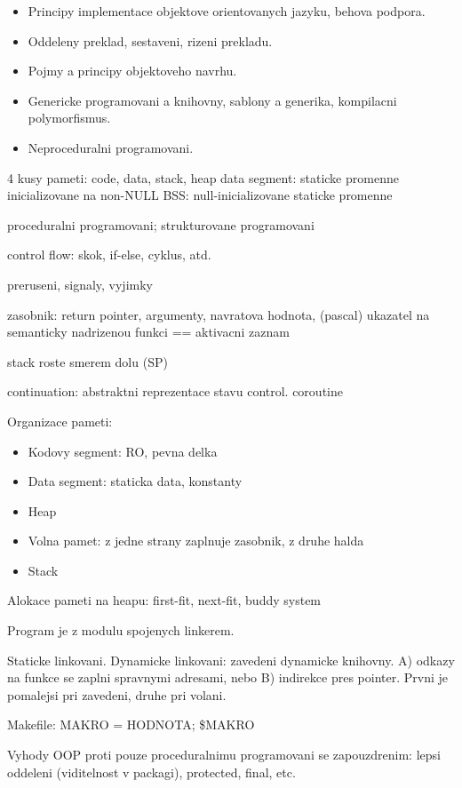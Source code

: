 \begin{itemize}
\item Principy implementace objektove orientovanych jazyku, behova podpora.
\item Oddeleny preklad, sestaveni, rizeni prekladu.
\item Pojmy a principy objektoveho navrhu.
\item Genericke programovani a knihovny, sablony a generika, kompilacni polymorfismus.
\item Neproceduralni programovani.
\end{itemize}

4 kusy pameti: code, data, stack, heap
data segment: staticke promenne inicializovane na non-NULL
BSS: null-inicializovane staticke promenne

proceduralni programovani; strukturovane programovani

control flow: skok, if-else, cyklus, atd.

preruseni, signaly, vyjimky

zasobnik: return pointer, argumenty, navratova hodnota, (pascal) ukazatel na
semanticky nadrizenou funkci == aktivacni zaznam

stack roste smerem dolu (SP)

continuation: abstraktni reprezentace stavu control.
coroutine

Organizace pameti:
\begin{itemize}
\item Kodovy segment: RO, pevna delka
\item Data segment: staticka data, konstanty
\item Heap
\item Volna pamet: z jedne strany zaplnuje zasobnik, z druhe halda
\item Stack
\end{itemize}

Alokace pameti na heapu: first-fit, next-fit, buddy system

Program je z modulu spojenych linkerem.

Staticke linkovani.
Dynamicke linkovani: zavedeni dynamicke knihovny.
A) odkazy na funkce se zaplni spravnymi adresami, nebo
B) indirekce pres pointer. Prvni je pomalejsi pri zavedeni, druhe pri volani.

Makefile: MAKRO = HODNOTA; \${MAKRO}

Vyhody OOP proti pouze proceduralnimu programovani se zapouzdrenim:
lepsi oddeleni (viditelnost v packagi), protected, final, etc.

